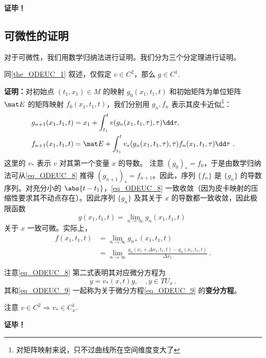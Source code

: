 \textbf{证毕！}

\subsection{可微性的证明}
对于可微性，我们用数学归纳法进行证明。我们分为三个分定理进行证明。
\begin{theorem}{}
同\autoref{the_ODEUC_1} 叙述，仅假定 $v\in C^2$，那么 $g\in C^1$.
\end{theorem}
\textbf{证明：}对初始点 $(t_1,x_1)\in M$ 的映射 $g_0(x_1,t_1,t)$ 和初始矩阵为单位矩阵 $\mat E$ 的矩阵映射 $f_0(x_1,t_1,t)$，我们分别用 $g_n,f_n$ 表示其皮卡近似\footnote{对矩阵映射来说，只不过曲线所在空间维度变大了}：
\begin{equation}\label{eq_ODEUC_8}
\begin{aligned}
g_{n+1}(x_1,t_1,t)&=x_1+\int_{t_1}^{t}v(g_n(x_1,t_1,\tau),\tau)\dd\tau,\\
f_{n+1}(x_1,t_1,t)&=\mat E+\int_{t_1}^{t}v_{*}(g_n(x_1,t_1,\tau),\tau)f_n(x_1,t_1,\tau)\dd\tau~.
\end{aligned}
\end{equation}
这里的 $v_{*}$ 表示 $v$ 对其第一个变量 $x$ 的导数。
注意 $(g_{0})_{*}=f_0$，于是由数学归纳法可从\autoref{eq_ODEUC_8} 推得 $(g_{n+1})_{*}=f_{n+1}$。因此，序列 $\{f_n\}$ 是 $\{g_n\}$ 的导数序列。对充分小的 $\abs{t-t_1}$，\autoref{eq_ODEUC_8} 一致收敛（因为皮卡映射的压缩性要求其不动点存在）。因此序列 $\{g_n\}$ 及其关于 $x$ 的导数都一致收敛，因此极限函数
\begin{equation}
g(x_1,t_1,t)=\lim_{n\rightarrow\infty}g_n(x_1,t_1,t)~
\end{equation}
关于 $x$ 一致可微。实际上，
\begin{equation}
\begin{aligned}
f(x_1,t_1,t)&=\lim_{n\rightarrow\infty}g_{n*}(x_1,t_1,t)\\
&=\lim\limits_{n\rightarrow\infty}\frac{g_{n}(x_1+\Delta x_1,t_1,t)-g_{n}(x_1,t_1,t)}{\Delta x_1}~.
\end{aligned}
\end{equation}


注意\autoref{eq_ODEUC_8} 第二式表明其对应微分方程为
\begin{equation}
\dot y=v_*(x,t)y,\quad ,y\in TU_x~.
\end{equation}
其和\autoref{eq_ODEUC_9} 一起称为关于微分方程\autoref{eq_ODEUC_9} 的\textbf{变分方程}。

注意 $v\in C^2\Rightarrow v_*\in C_{x}^1$.

\textbf{证毕！}

